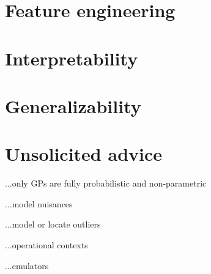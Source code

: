 \documentclass[12pt, letterpaper]{article}
\begin{document}
\section{Feature engineering}

\section{Interpretability}

\section{Generalizability}

\section{Unsolicited advice}

...only GPs are fully probabilistic and non-parametric

...model nuisances

...model or locate outliers

...operational contexts

...emulators
\end{document}
